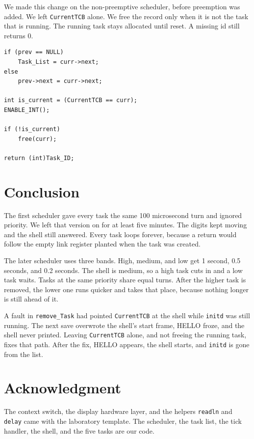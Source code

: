 \documentclass[conference,a4paper]{IEEEtran}
\begin{document}
We made this change on the non-preemptive scheduler, before preemption was added. We left \texttt{CurrentTCB} alone. We free the record only when it is not the task that is running. The running task stays allocated until reset. A missing id still returns 0.

\noindent\begin{minipage}{\columnwidth}
\begin{verbatim}
if (prev == NULL)
    Task_List = curr->next;
else
    prev->next = curr->next;

int is_current = (CurrentTCB == curr);
ENABLE_INT();

if (!is_current)
    free(curr);

return (int)Task_ID;
\end{verbatim}
\end{minipage}

\section{Conclusion}

The first scheduler gave every task the same 100 microsecond turn and ignored priority. We left that version on for at least five minutes. The digits kept moving and the shell still answered. Every task loops forever, because a return would follow the empty link register planted when the task was created.

The later scheduler uses three bands. High, medium, and low get 1 second, 0.5 seconds, and 0.2 seconds. The shell is medium, so a high task cuts in and a low task waits. Tasks at the same priority share equal turns. After the higher task is removed, the lower one runs quicker and takes that place, because nothing longer is still ahead of it.

A fault in \texttt{remove\_Task} had pointed \texttt{CurrentTCB} at the shell while \texttt{initd} was still running. The next save overwrote the shell's start frame, HELLO froze, and the shell never printed. Leaving \texttt{CurrentTCB} alone, and not freeing the running task, fixes that path. After the fix, HELLO appears, the shell starts, and \texttt{initd} is gone from the list.

\section*{Acknowledgment}

The context switch, the display hardware layer, and the helpers \texttt{readln} and \texttt{delay} came with the laboratory template. The scheduler, the task list, the tick handler, the shell, and the five tasks are our code.
\end{document}
